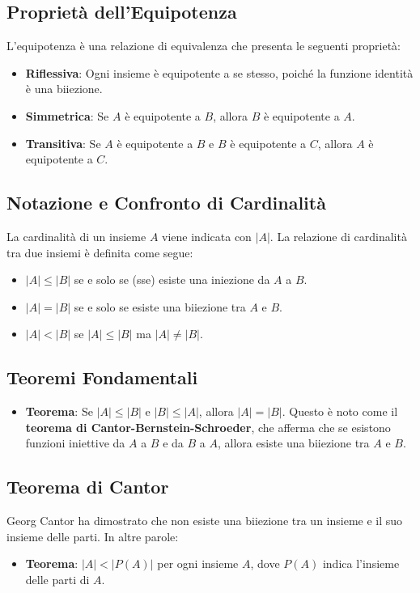 \documentclass{article}
\begin{document}
\subsection{Proprietà dell'Equipotenza}
L'equipotenza è una relazione di equivalenza che presenta le seguenti proprietà:
\begin{itemize}
\item \textbf{Riflessiva}: Ogni insieme è equipotente a se stesso, poiché la funzione identità è una biiezione.
\item \textbf{Simmetrica}: Se $A$ è equipotente a $B$, allora $B$ è equipotente a $A$.
\item \textbf{Transitiva}: Se $A$ è equipotente a $B$ e $B$ è equipotente a $C$, allora $A$ è equipotente a $C$.
\end{itemize}

\subsection{Notazione e Confronto di Cardinalità}
La cardinalità di un insieme $A$ viene indicata con $|A|$. La relazione di cardinalità tra due insiemi è definita come segue:
\begin{itemize}
\item $|A| \leq |B|$ se e solo se (sse) esiste una iniezione da $A$ a $B$.
\item $|A| = |B|$ se e solo se esiste una biiezione tra $A$ e $B$.
\item $|A| < |B|$ se $|A| \leq |B|$ ma $|A| \neq |B|$.
\end{itemize}

\subsection{Teoremi Fondamentali}
\begin{itemize}
\item \textbf{Teorema}: Se $|A| \leq |B|$ e $|B| \leq |A|$, allora $|A| = |B|$. Questo è noto come il \textbf{teorema di Cantor-Bernstein-Schroeder}, che afferma che se esistono funzioni iniettive da $A$ a $B$ e da $B$ a $A$, allora esiste una biiezione tra $A$ e $B$.
\end{itemize}

\subsection{Teorema di Cantor}
Georg Cantor ha dimostrato che non esiste una biiezione tra un insieme e il suo insieme delle parti. In altre parole:
\begin{itemize}
\item \textbf{Teorema}: $|A| < |P(A)|$ per ogni insieme $A$, dove $P(A)$ indica l'insieme delle parti di $A$.
\end{itemize}
\newpage
\end{document}
